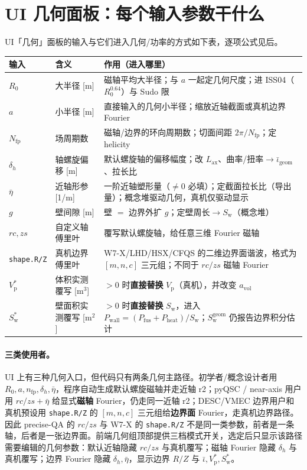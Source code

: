 \documentclass[UTF8,11pt]{ctexart}
\newcommand{\Vp}{V_\mathrm{p}}
\newcommand{\Sw}{S_\mathrm{w}}
\newcommand{\Lax}{L_\mathrm{ax}}
\newcommand{\Pfus}{P_\mathrm{fus}}
\newcommand{\Pheat}{P_\mathrm{heat}}
\newcommand{\Pwall}{P_\mathrm{wall}}
\newcommand{\iotabar}{\bar{\iota}}
\begin{document}
\section{UI 几何面板：每个输入参数干什么}\label{sec:inputs}

UI「几何」面板的输入与它们进入几何/功率的方式如下表，逐项公式见后。

\begin{center}
\renewcommand{\arraystretch}{1.32}
\begin{tabular}{@{}llp{7.4cm}@{}}
\toprule
输入 & 含义 & 作用（进入哪里）\\
\midrule
$R_0$ & 大半径 [m] & 磁轴平均大半径；与 $a$ 一起定几何尺度；进 ISS04（$R_0^{0.64}$）与 Sudo 限 \\
$a$ & 小半径 [m] & 直接输入的几何小半径；缩放近轴截面或真机边界 Fourier \\
$N_\mathrm{fp}$ & 场周期数 & 磁轴/边界的环向周期数；切面间距 $2\pi/N_\mathrm{fp}$；定 helicity \\
$\delta_h$ & 轴螺旋偏移 [m] & 默认螺旋轴的偏移幅度；改 $\Lax$、曲率/扭率$\to\iotabar_\mathrm{geom}$、拉长比 \\
$\bar\eta$ & 近轴形参 [1/m] & 一阶近轴塑形量（$\ne0$ 必填）；定截面拉长比（导出量）；概念堆驱动几何，真机仅驱动显示 \\
$g$ & 壁间隙 [m] & 壁 $=$ 边界外扩 $g$；定壁周长$\to\Sw$（概念堆） \\
$rc,zs$ & 自定义轴傅里叶 & 覆写默认螺旋轴，给任意三维 Fourier 磁轴 \\
\texttt{shape.R/Z} & 真机边界傅里叶 & W7-X/LHD/HSX/CFQS 的二维边界面谐波，格式为 $[m,n,c]$ 三元组；不同于 $rc/zs$ 磁轴 Fourier \\
$\Vp^{*}$ & 体积实测覆写 [m$^3$] & $>0$ 时\textbf{直接替换} $\Vp$（真机），并改变 $a_\mathrm{vol}$ \\
$\Sw^{*}$ & 壁面积实测覆写 [m$^2$] & $>0$ 时\textbf{直接替换} $\Sw$，进入 $\Pwall=(\Pfus+\Pheat)/\Sw$；$\Sw^{\mathrm{geom}}$ 仍报告边界积分估计 \\
\bottomrule
\end{tabular}
\end{center}

\paragraph{三类使用者。}
UI 上有三种几何入口，但代码只有两条几何主路径。初学者/概念设计者用 $R_0,a,n_\mathrm{fp},\delta_h,\bar\eta$，程序自动生成默认螺旋磁轴并走近轴 r2；pyQSC / near-axis 用户用 $rc/zs+\bar\eta$ 给显式\textbf{磁轴} Fourier，仍走同一近轴 r2；DESC/VMEC 边界用户和真机预设用 \texttt{shape.R/Z} 的 $[m,n,c]$ 三元组给\textbf{边界面} Fourier，走真机边界路径。因此 precise-QA 的 $rc/zs$ 与 W7-X 的 \texttt{shape.R/Z} 不是同一类参数，前者是一条轴，后者是一张边界面。前端几何组顶部提供三档模式开关，选定后只显示该路径需要编辑的几何参数：默认近轴隐藏 $rc/zs$ 与真机覆写；磁轴 Fourier 隐藏 $\delta_h$ 与真机覆写；边界 Fourier 隐藏 $\delta_h,\bar\eta$，显示边界 $R/Z$ 与 $\iotabar,\Vp^*,\Sw^*$。
\end{document}
